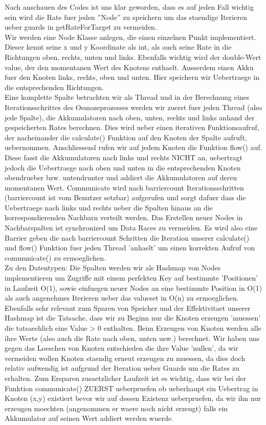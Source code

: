 \documentclass[12pt]{article}
\begin{document}
Nach anschauen des Codes ist uns klar geworden, dass es auf jeden Fall wichtig sein wird die Rate fuer jeden ''Node'' zu speichern um das staendige Iterieren ueber guards in getRateForTarget zu vermeiden.\\
Wir werden eine Node Klasse anlegen, die einen einzelnen Punkt implementiert. Dieser kennt seine x und y Koordinate als int, als auch seine Rate in die Richtungen oben, rechts, unten und links. Ebenfalls wichtig wird der double-Wert value, der den momentanen Wert des Knotens enthaelt. Ausserdem einen Akku fuer den Knoten links, rechts, oben und unten. Hier speichern wir Uebertraege in die entsprechenden Richtungen.\\
Eine komplette Spalte betrachten wir als Thread und in der Berechnung eines Iterationsschrittes des Osmozeprozesses werden wir zuerst fuer jeden Thread (also jede Spalte), die Akkumulatoren nach oben, unten, rechts und links anhand der gespeicherten Rates berechnen. Dies wird ueber einen iterativen Funktionsaufruf, der nacheinander die calculate() Funktion auf den Knoten der Spalte aufruft, uebernommen. Anschliessend rufen wir auf jedem Knoten die Funktion flow() auf. Diese fasst die Akkumulatoren nach links und rechts NICHT an, uebertragt jedoch die Uebertraege nach oben und unten in die entsprechenden Knoten obendrueber bzw. untendrunter und addiert die Akkumulatoren auf deren momentanen Wert. Communicate wird nach barriercount Iterationsschritten (barriercount ist vom Benutzer setzbar) aufgerufen und sorgt dafuer dass die Uebertraege nach links und rechts ueber die Spalten hinaus an die korrespondierenden Nachbarn verteilt werden. Das Erstellen neuer Nodes in Nachbarspalten ist synchronized um Data Races zu vermeiden. Es wird also eine Barrier geben die nach barriercount Schritten die Iteration unserer calculate() und flow() Funktion fuer jeden Thread 'anhaelt' um einen korrekten Aufruf von communicate() zu ermoeglichen.\\
Zu den Datentypen: Die Spalten werden wir als Hashmap von Nodes implementieren um Zugriffe mit einem perfekten Key auf bestimmte 'Positionen' in Laufzeit O(1), sowie einfuegen neuer Nodes an eine bestimmte Position in O(1) als auch angenehmes Iterieren ueber das valueset in O(n) zu ermoeglichen.\\
Ebenfalls sehr relevant zum Sparen von Speicher und der Effektivitaet unserer Hashmap ist die Tatsache, dass wir zu Beginn nur die Knoten erzeugen 'muessen' die tatsaechlich eine Value > 0 enthalten. Beim Erzeugen von Knoten werden alle ihre Werte (also auch die Rate nach oben, unten usw.) berechnet. Wir haben uns gegen das Loeschen von Knoten entschieden die ihre Value 'nullen', da wir vermeiden wollen Knoten staendig erneut erzeugen zu muessen, da dies doch relativ aufwendig ist aufgrund der Iteration ueber Guards um die Rates zu erhalten. Zum Ersparen zusaetzlicher Laufzeit ist es wichtig, dass wir bei der Funktion communicate() ZUERST ueberpruefen ob ueberhaupt ein Uebertrag in Knoten (x,y) existiert bevor wir auf dessen Existenz ueberpruefen, da wir ihn nur erzeugen moechten (angenommen er waere noch nicht erzeugt) falls ein Akkumulator auf seinen Wert addiert werden wuerde.\\
\end{document}
